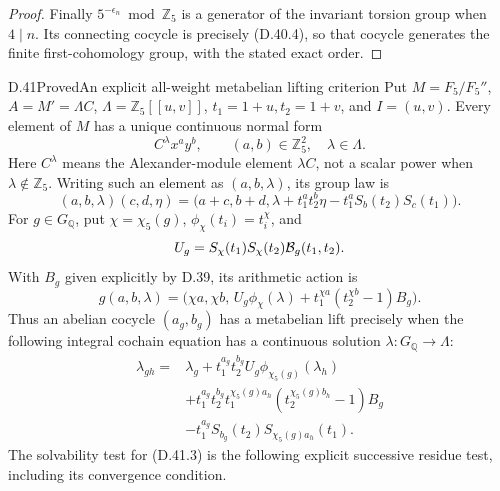 \begin{proof}
Finally \(5^{-\epsilon_n}\bmod\mathbb Z_5\) is a
generator of the invariant torsion group when \(4\mid n\).
Its connecting cocycle is precisely (D.40.4), so that
cocycle generates the finite first-cohomology group,
with the stated exact order.
\end{proof}

\begin{statement}{D.41}{Proved}{An explicit all-weight metabelian lifting criterion}
Put \(M=F_5/F_5''\), \(A=M'=\Lambda C\),
\(\Lambda=\mathbb Z_5[[u,v]]\), \(t_1=1+u,t_2=1+v\),
and \(I=(u,v)\). Every element of \(M\) has a unique
continuous normal form
\[
                    C^\lambda x^a y^b,
       \qquad (a,b)\in\mathbb Z_5^2,\quad\lambda\in\Lambda.
\]
Here \(C^\lambda\) means the Alexander-module element
\(\lambda C\), not a scalar power when \(\lambda\notin\mathbb Z_5\).
Writing such an element as \((a,b,\lambda)\), its group law is
\[
 (a,b,\lambda)(c,d,\eta)=
 \bigl(a+c,b+d,\lambda+t_1^at_2^b\eta
                   -t_1^aS_b(t_2)S_c(t_1)\bigr).         \tag{D.41.1}
\]
For \(g\in G_{\mathbb Q}\), put \(\chi=\chi_5(g)\),
\(\phi_\chi(t_i)=t_i^\chi\), and
\[
 U_g=S_\chi(t_1)S_\chi(t_2){\cal B}_g(t_1,t_2).
\]
With \(B_g\) given explicitly by D.39, its arithmetic action is
\[
 g(a,b,\lambda)=
 \bigl(\chi a,\chi b,\,
 U_g\phi_\chi(\lambda)
       +t_1^{\chi a}(t_2^{\chi b}-1)B_g\bigr).            \tag{D.41.2}
\]
Thus an abelian cocycle \((a_g,b_g)\) has a metabelian
lift precisely when the following integral cochain equation
has a continuous solution \(\lambda:G_{\mathbb Q}\to\Lambda\):
\[
\begin{split}
 \lambda_{gh}={}&\lambda_g+
       t_1^{a_g}t_2^{b_g}U_g\phi_{\chi_5(g)}(\lambda_h)\\
 &+t_1^{a_g}t_2^{b_g}t_1^{\chi_5(g)a_h}
              (t_2^{\chi_5(g)b_h}-1)B_g\\
 &-t_1^{a_g}S_{b_g}(t_2)S_{\chi_5(g)a_h}(t_1).
\end{split}
\tag{D.41.3}
\]
The solvability test for (D.41.3) is the following explicit
successive residue test, including its convergence condition.


\end{statement}
